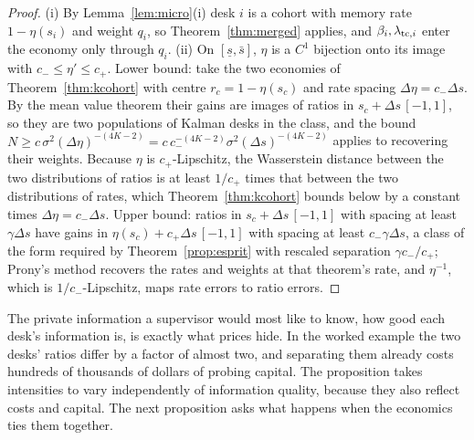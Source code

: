 \begin{proof}
(i) By Lemma~\ref{lem:micro}(i) desk $i$ is a cohort with memory rate $1-\eta(s_i)$ and weight $q_i$, so Theorem~\ref{thm:merged} applies, and $\beta_i,\lambda_{{\rm tc},i}$ enter the economy only through $q_i$. (ii) On $[\underline s,\bar s]$, $\eta$ is a $C^1$ bijection onto its image with $c_-\le\eta'\le c_+$. Lower bound: take the two economies of Theorem~\ref{thm:kcohort} with centre $r_c=1-\eta(s_c)$ and rate spacing $\Delta\eta=c_-\Delta s$. By the mean value theorem their gains are images of ratios in $s_c+\Delta s\,[-1,1]$, so they are two populations of Kalman desks in the class, and the bound $N\ge c\,\sigma^2(\Delta\eta)^{-(4K-2)}=c\,c_-^{-(4K-2)}\sigma^2(\Delta s)^{-(4K-2)}$ applies to recovering their weights. Because $\eta$ is $c_+$-Lipschitz, the Wasserstein distance between the two distributions of ratios is at least $1/c_+$ times that between the two distributions of rates, which Theorem~\ref{thm:kcohort} bounds below by a constant times $\Delta\eta=c_-\Delta s$. Upper bound: ratios in $s_c+\Delta s\,[-1,1]$ with spacing at least $\gamma\Delta s$ have gains in $\eta(s_c)+c_+\Delta s\,[-1,1]$ with spacing at least $c_-\gamma\Delta s$, a class of the form required by Theorem~\ref{prop:esprit} with rescaled separation $\gamma c_-/c_+$; Prony's method recovers the rates and weights at that theorem's rate, and $\eta^{-1}$, which is $1/c_-$-Lipschitz, maps rate errors to ratio errors.
\end{proof}

The private information a supervisor would most like to know, how good each desk's information is, is exactly what prices hide. In the worked example the two desks' ratios differ by a factor of almost two, and separating them already costs hundreds of thousands of dollars of probing capital. The proposition takes intensities to vary independently of information quality, because they also reflect costs and capital. The next proposition asks what happens when the economics ties them together.

